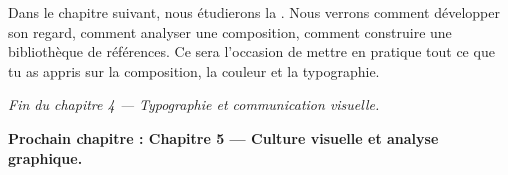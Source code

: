 Dans le chapitre suivant, nous étudierons la . Nous verrons comment développer son regard, comment analyser une composition, comment construire une bibliothèque de références. Ce sera l'occasion de mettre en pratique tout ce que tu as appris sur la composition, la couleur et la typographie.

\vspace{2em}

\begin{center}
\textit{Fin du chapitre 4 --- Typographie et communication visuelle.}

\vspace{1em}

\textbf{Prochain chapitre : Chapitre 5 --- Culture visuelle et analyse graphique.}
\end{center}